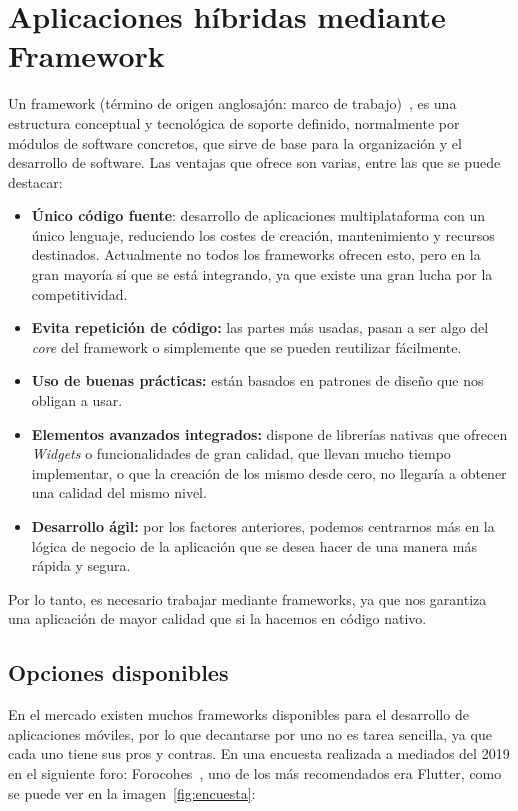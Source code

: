 \section{Aplicaciones híbridas mediante Framework}
Un framework (término de origen anglosajón: marco de trabajo)~\cite{wiki:framework}, es una estructura conceptual y tecnológica de soporte definido, normalmente por módulos de software concretos, que sirve de base para la organización y el desarrollo de software. Las ventajas que ofrece son varias, entre las que se puede destacar:

\begin{itemize}
	\item \textbf{Único código fuente}: desarrollo de aplicaciones multiplataforma con un único lenguaje, reduciendo los costes de creación, mantenimiento y recursos destinados. Actualmente no todos los frameworks ofrecen esto, pero en la gran mayoría sí que se está integrando, ya que existe una gran lucha por la competitividad.
	\item \textbf{Evita repetición de código:} las partes más usadas, pasan a ser algo del \emph{core} del framework o simplemente que se pueden reutilizar fácilmente. 
	\item \textbf{Uso de buenas prácticas:} están basados en patrones de diseño que nos obligan a usar.
	\item \textbf{Elementos avanzados integrados:} dispone de librerías nativas que ofrecen \emph{Widgets} o funcionalidades de gran calidad, que llevan mucho tiempo implementar, o que la creación de los mismo desde cero, no llegaría a obtener una calidad del mismo nivel.
	\item \textbf{Desarrollo ágil:} por los factores anteriores, podemos centrarnos más en la lógica de negocio de la aplicación que se desea hacer de una manera más rápida y segura.
\end{itemize}

Por lo tanto, es necesario trabajar mediante frameworks, ya que nos garantiza una aplicación de mayor calidad que si la hacemos en código nativo.

\subsection{Opciones disponibles}
En el mercado existen muchos frameworks disponibles para el desarrollo de aplicaciones móviles, por lo que decantarse por uno no es tarea sencilla, ya que cada uno tiene sus pros y contras. En una encuesta realizada a mediados del 2019 en el siguiente foro: Forocohes~\cite{foro:encuesta}, uno de los más recomendados era Flutter, como se puede ver en la imagen~\ref{fig:encuesta}:


